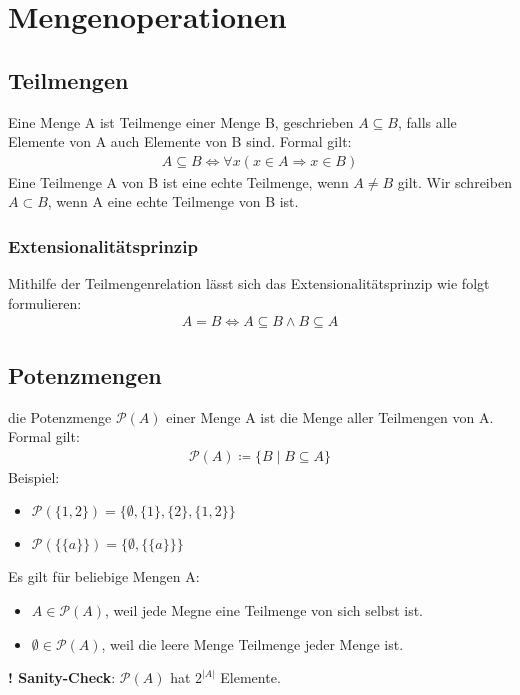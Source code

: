\section{Mengenoperationen}
\subsection{Teilmengen}
Eine Menge A ist Teilmenge einer Menge B, geschrieben $A \subseteq B$, falls alle Elemente von A auch Elemente von B sind.
Formal gilt:
\begin{align*}
    A \subseteq B \Leftrightarrow \forall{x}(x \in A \Rightarrow x \in B)
\end{align*}
Eine Teilmenge A  von B ist eine echte Teilmenge, wenn $A \neq B$ gilt. Wir schreiben $A \subset B$,
wenn A eine echte Teilmenge von B ist.

\subsubsection{Extensionalitätsprinzip}
Mithilfe der Teilmengenrelation lässt sich das Extensionalitätsprinzip wie folgt formulieren:
\begin{align*}
    A = B \Leftrightarrow A \subseteq B \wedge B \subseteq A
\end{align*}

\subsection{Potenzmengen}
die Potenzmenge $\mathcal{P}(A)$ einer Menge A ist die Menge aller Teilmengen von A. Formal gilt:
\begin{align*}
\mathcal{P}(A) \coloneqq \{B \mid B \subseteq A\}
\end{align*}
Beispiel: 
\begin{itemize}
    \item $\mathcal{P}(\{1,2\}) = \{\emptyset, \{1\}, \{2\}, \{1,2\}\}$
    \item $\mathcal{P}(\{\{a\}\}) = \{\emptyset, \{\{a\}\}\}$
\end{itemize}

Es gilt für beliebige Mengen A:
\begin{itemize}
    \item $A \in \mathcal{P}(A)$, weil jede Megne eine Teilmenge von sich selbst ist.
    \item $\emptyset \in \mathcal{P}(A)$, weil die leere Menge Teilmenge jeder Menge ist.
\end{itemize}
{\bf! Sanity-Check}: $\mathcal{P}(A)$ hat $2^{|A|}$ Elemente.
